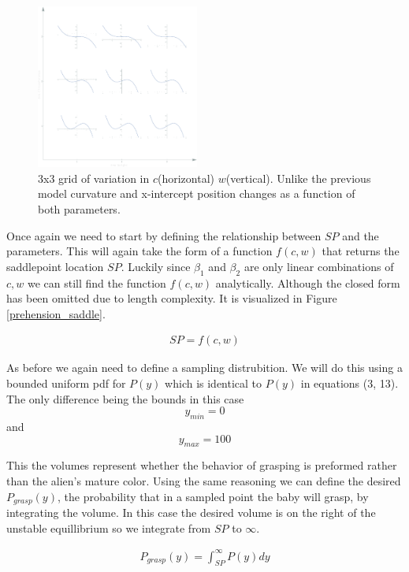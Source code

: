 \documentclass[letterpaper]{article}
\begin{document}
\begin{figure}[t]
\begin{center}
\includegraphics[width=2.1in,angle=0]{./prehension_params.png}
\caption{3x3 grid of variation in $c$(horizontal) $w$(vertical). Unlike the previous
model curvature and x-intercept position changes as a function of both parameters.}
\label{fig5}
\end{center}
\end{figure}

Once again we need to start by defining the relationship between $SP$ and 
the parameters.
This will again take the form of a function $f(c,w)$ that returns the 
saddlepoint location 
$SP$.
Luckily since $\beta_1$ and $\beta_2$ are only linear combinations of $c,w$ we can still
find the function $f(c,w)$ analytically. Although the closed form 
has been omitted due to length
complexity. It is visualized in Figure \ref{prehension_saddle}.

\begin{eqnarray}
  SP = f(c,w)
\end{eqnarray}

As before we again
need to define a sampling distrubition. We will do this using a bounded uniform
pdf for $P(y)$ which is identical to $P(y)$ in equations (3, 13). 
The only difference being the bounds in this case
\[
  y_{min} = 0
  \] 
  and 
  \[y_{max} = 100\]

This the volumes represent whether the behavior of grasping
is preformed rather than the alien's mature
color. Using the same reasoning we can define the desired $P_{grasp}(y)$, 
the probability
that in a sampled point the baby will grasp, by integrating the volume. In this case
the desired volume is on the right of the unstable equillibrium 
so we integrate from $SP$ to $\infty$.

\begin{eqnarray}
    P_{grasp}(y) = \int_{SP}^{\infty}P(y)dy
\end{eqnarray}
\end{document}
